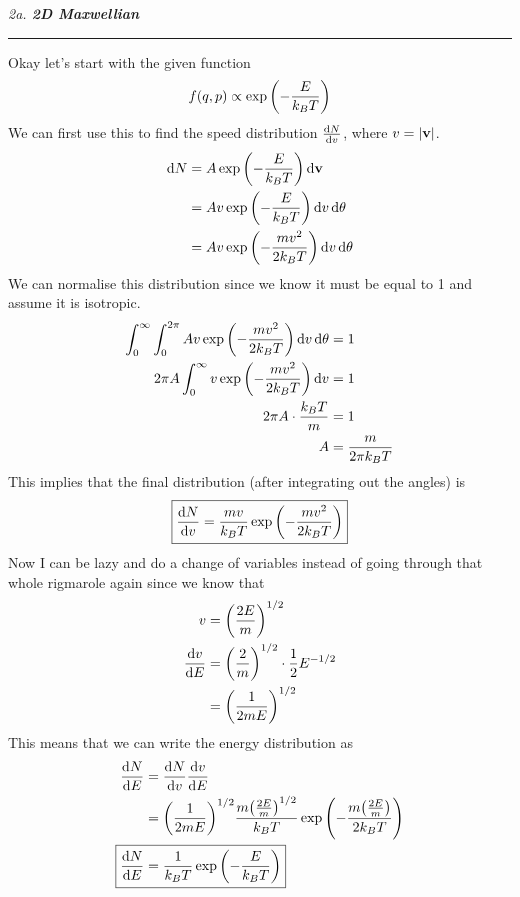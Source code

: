 \documentclass[12pt, letterpaper, twoside]{article}
\newcommand{\question}[1]{{\noindent \it #1}}
\newcommand{\answer}[1]{
    \par\noindent\rule{\textwidth}{0.4pt}#1\vspace{0.5cm}
}
\begin{document}
\question{2a. \textbf{2D Maxwellian}}
\answer{
    Okay let's start with the given function
    \begin{equation}
        f(q, p) \propto \exp \qty( - \frac{E}{k_B T} )
    \end{equation}
    We can first use this to find the speed distribution $\dv{N}{v}$, where $v = \abs{\vb{v}}$.
    \begin{align}
        \dd{N} &= A \exp \qty( - \frac{E}{k_B T} ) \dd{\vb{v}} \\
                  &= A v \exp \qty( - \frac{E}{k_B T} ) \dd{v} \dd{\theta} \\
                  &= A v \exp \qty( - \frac{m v^2}{2 k_B T} ) \dd{v} \dd{\theta}
    \end{align}
    We can normalise this distribution since we know it must be equal to 1 and assume it is isotropic.
    \begin{align}
        \int_0^{\infty} \int_0^{2\pi} A v \exp \qty( - \frac{m v^2}{2 k_B T} ) \dd{v} \dd{\theta} &= 1 \\
        2 \pi A \int_0^{\infty} v \exp \qty( - \frac{m v^2}{2 k_B T} ) \dd{v} &= 1 \\
        2 \pi A \cdot \frac{k_B T}{m} &= 1 \\
        A &= \frac{m}{2 \pi k_B T}
    \end{align}
    This implies that the final distribution (after integrating out the angles) is
    \begin{equation}\label{eq:v_dist}
        \boxed{ \dv{N}{v} = \frac{m v}{k_B T} \exp \qty( - \frac{m v^2}{2 k_B T} ) }
    \end{equation}
    Now I can be lazy and do a change of variables instead of going through that whole rigmarole again since we know that
    \begin{align}
        v &= \qty(\frac{2 E}{m})^{1/2} \\
        \dv{v}{E} &= \qty(\frac{2}{m})^{1/2} \cdot \frac{1}{2} E^{-1/2} \\
                  &= \qty(\frac{1}{2 m E})^{1/2}
    \end{align}
    This means that we can write the energy distribution as
    \begin{align}
        \dv{N}{E} &= \dv{N}{v} \dv{v}{E} \\
                  &= \qty(\frac{1}{2 m E})^{1/2} \frac{m \qty(\frac{2 E}{m})^{1/2}}{k_B T} \exp \qty( - \frac{m \qty(\frac{2 E}{m})}{2 k_B T} ) \\
        \Aboxed{ \dv{N}{E} &= \frac{1}{k_B T} \exp \qty( - \frac{E}{k_B T} ) }\label{eq:e_dist}
    \end{align}
}
\end{document}
